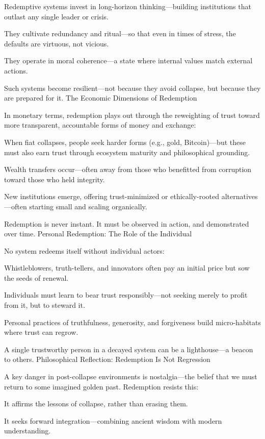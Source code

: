 \documentclass[11pt,oneside]{book}
\begin{document}
    Redemptive systems invest in long-horizon thinking—building institutions that outlast any single leader or crisis.

    They cultivate redundancy and ritual—so that even in times of stress, the defaults are virtuous, not vicious.

    They operate in moral coherence—a state where internal values match external actions.

Such systems become resilient—not because they avoid collapse, but because they are prepared for it.
The Economic Dimensions of Redemption

In monetary terms, redemption plays out through the reweighting of trust toward more transparent, accountable forms of money and exchange:

    When fiat collapses, people seek harder forms (e.g., gold, Bitcoin)—but these must also earn trust through ecosystem maturity and philosophical grounding.

    Wealth transfers occur—often away from those who benefitted from corruption toward those who held integrity.

    New institutions emerge, offering trust-minimized or ethically-rooted alternatives—often starting small and scaling organically.

Redemption is never instant. It must be observed in action, and demonstrated over time.
Personal Redemption: The Role of the Individual

No system redeems itself without individual actors:

    Whistleblowers, truth-tellers, and innovators often pay an initial price but sow the seeds of renewal.

    Individuals must learn to bear trust responsibly—not seeking merely to profit from it, but to steward it.

    Personal practices of truthfulness, generosity, and forgiveness build micro-habitats where trust can regrow.

A single trustworthy person in a decayed system can be a lighthouse—a beacon to others.
Philosophical Reflection: Redemption Is Not Regression

A key danger in post-collapse environments is nostalgia—the belief that we must return to some imagined golden past. Redemption resists this:

    It affirms the lessons of collapse, rather than erasing them.

    It seeks forward integration—combining ancient wisdom with modern understanding.
\end{document}
